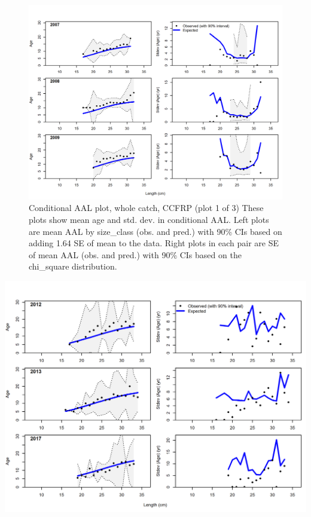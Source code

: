 \documentclass[12pt,]{article}
\begin{document}
\begin{figure}
\centering
\includegraphics{./r4ss/plots_mod1/comp_condAALfit_Andre_plotsflt9mkt0_page1.png}
\caption{Conditional AAL plot, whole catch, CCFRP (plot 1 of 3) These
plots show mean age and std. dev. in conditional AAL. Left plots are
mean AAL by size\_class (obs. and pred.) with 90\% CIs based on adding
1.64 SE of mean to the data. Right plots in each pair are SE of mean AAL
(obs. and pred.) with 90\% CIs based on the chi\_square distribution.
\label{fig:mod1_13_comp_condAALfit_Andre_plotsflt9mkt0_page1}}
\end{figure}

\includegraphics{./r4ss/plots_mod1/comp_condAALfit_Andre_plotsflt9mkt0_page2.png}
\end{document}
